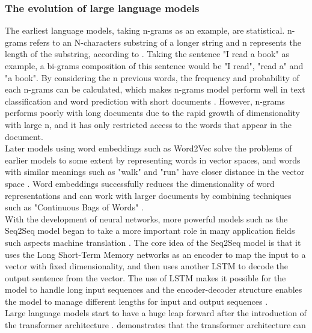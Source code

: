 \documentclass[runningheads]{llncs}
\begin{document}
\subsubsection{The evolution of large language models}  
\noindent \newline 
The earliest language models, taking n-grams as an example, are statistical. n-grams refers to an N-characters substring of a longer string and n represents the length of the substring, according to \cite{Cavnar94}.
Taking the sentence "I read a book" as example, a bi-grams composition of this sentence would be "I read", "read a" and "a book". By considering the n previous words, the frequency and probability of each
n-grams can be calculated, which makes n-grams model perform well in text classification and word prediction with short documents \cite{Cavnar94}. 
However, n-grams performs poorly with long documents due to the rapid growth of dimensionality with large n, and it has only restricted access to the words that appear in the document.\\
\noindent \newline
Later models using word embeddings such as Word2Vec solve the problems of earlier models to some extent by representing words in vector spaces, and words with similar meanings such as "walk" and "run" have closer distance
in the vector space \cite{Mikolov13}. Word embeddings successfully reduces the dimensionality of word representations and can work with larger documents by combining techniques such as "Continuous Bags of Words" \cite{Mikolov13}. \\   
\noindent \newline
With the development of neural networks, more powerful models such as the Seq2Seq model began to take a more important role in many application fields such aspects
machine translation \cite{Sutskever14}. The core idea of the Seq2Seq model is that it uses the Long Short-Term Memory networks as an encoder to map the input to a vector with fixed dimensionality, and then
uses another LSTM to decode the output sentence from the vector. The use of LSTM makes it possible for the model to handle long input sequences and the encoder-decoder structure enables the model 
to manage different lengths for input and output sequences \cite{Sutskever14}. \\
\noindent \newline
Large language models start to have a huge leap forward after the introduction of the transformer architecture \cite{Vaswani17}. \cite{Radford18} demonstrates that the transformer architecture can
\end{document}
